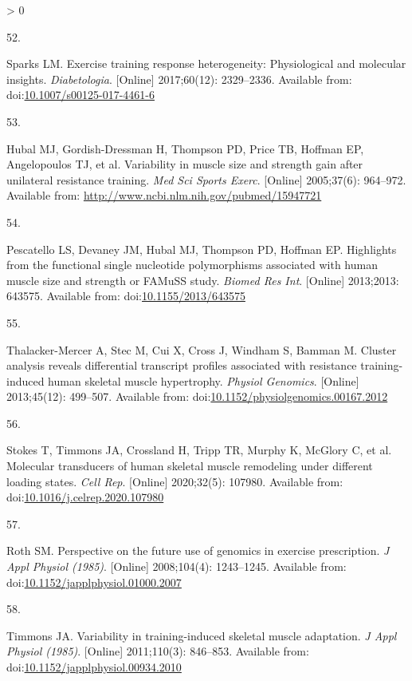 \documentclass[twoside,10pt]{gihclass} %
\newlength{\cslhangindent}
\newlength{\csllabelwidth}
\newenvironment{CSLReferences}[3] %
 {%
  \setlength{\parindent}{0pt}
  \ifodd #1 \everypar{\setlength{\hangindent}{\cslhangindent}}\ignorespaces\fi
  \ifnum #2 > 0
  \setlength{\parskip}{#2\baselineskip}
  \fi
 }%
 {}
\newcommand{\CSLLeftMargin}[1]{\parbox[t]{\maxof{\widthof{#1}}{\csllabelwidth}}{#1}}
\newcommand{\CSLRightInline}[1]{\parbox[t]{\linewidth}{#1}}
\begin{document}
\begin{CSLReferences}{0}{0}
\leavevmode\hypertarget{ref-RN2677}{}%
\CSLLeftMargin{52. }
\CSLRightInline{Sparks LM. Exercise training response heterogeneity: Physiological and molecular insights. \emph{Diabetologia}. {[}Online{]} 2017;60(12): 2329--2336. Available from: doi:\href{https://doi.org/10.1007/s00125-017-4461-6}{10.1007/s00125-017-4461-6}}

\leavevmode\hypertarget{ref-RN764}{}%
\CSLLeftMargin{53. }
\CSLRightInline{Hubal MJ, Gordish-Dressman H, Thompson PD, Price TB, Hoffman EP, Angelopoulos TJ, et al. Variability in muscle size and strength gain after unilateral resistance training. \emph{Med Sci Sports Exerc}. {[}Online{]} 2005;37(6): 964--972. Available from: \url{http://www.ncbi.nlm.nih.gov/pubmed/15947721}}

\leavevmode\hypertarget{ref-RN1263}{}%
\CSLLeftMargin{54. }
\CSLRightInline{Pescatello LS, Devaney JM, Hubal MJ, Thompson PD, Hoffman EP. Highlights from the functional single nucleotide polymorphisms associated with human muscle size and strength or FAMuSS study. \emph{Biomed Res Int}. {[}Online{]} 2013;2013: 643575. Available from: doi:\href{https://doi.org/10.1155/2013/643575}{10.1155/2013/643575}}

\leavevmode\hypertarget{ref-RN826}{}%
\CSLLeftMargin{55. }
\CSLRightInline{Thalacker-Mercer A, Stec M, Cui X, Cross J, Windham S, Bamman M. Cluster analysis reveals differential transcript profiles associated with resistance training-induced human skeletal muscle hypertrophy. \emph{Physiol Genomics}. {[}Online{]} 2013;45(12): 499--507. Available from: doi:\href{https://doi.org/10.1152/physiolgenomics.00167.2012}{10.1152/physiolgenomics.00167.2012}}

\leavevmode\hypertarget{ref-RN2684}{}%
\CSLLeftMargin{56. }
\CSLRightInline{Stokes T, Timmons JA, Crossland H, Tripp TR, Murphy K, McGlory C, et al. Molecular transducers of human skeletal muscle remodeling under different loading states. \emph{Cell Rep}. {[}Online{]} 2020;32(5): 107980. Available from: doi:\href{https://doi.org/10.1016/j.celrep.2020.107980}{10.1016/j.celrep.2020.107980}}

\leavevmode\hypertarget{ref-RN2698}{}%
\CSLLeftMargin{57. }
\CSLRightInline{Roth SM. Perspective on the future use of genomics in exercise prescription. \emph{J Appl Physiol (1985)}. {[}Online{]} 2008;104(4): 1243--1245. Available from: doi:\href{https://doi.org/10.1152/japplphysiol.01000.2007}{10.1152/japplphysiol.01000.2007}}

\leavevmode\hypertarget{ref-RN758}{}%
\CSLLeftMargin{58. }
\CSLRightInline{Timmons JA. Variability in training-induced skeletal muscle adaptation. \emph{J Appl Physiol (1985)}. {[}Online{]} 2011;110(3): 846--853. Available from: doi:\href{https://doi.org/10.1152/japplphysiol.00934.2010}{10.1152/japplphysiol.00934.2010}}


\end{CSLReferences}
\end{document}
